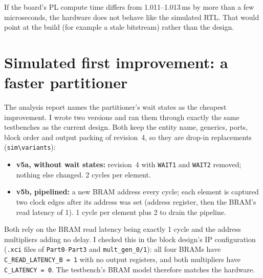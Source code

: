 \documentclass[11pt,a4paper]{article}
\newcommand{\code}[1]{\texttt{#1}}
\begin{document}
If the board's PL compute time differs from 1.011--1.013\,ms by more than a few microseconds, the hardware does not behave like the simulated RTL. That would point at the build (for example a stale bitstream) rather than the design.

\section{Simulated first improvement: a faster partitioner}\label{sec:variants}
The analysis report names the partitioner's wait states as the cheapest improvement. I wrote two versions and ran them through exactly the same testbenches as the current design. Both keep the entity name, generics, ports, block order and output packing of revision~4, so they are drop-in replacements (\code{sim\textbackslash variants}):
\begin{itemize}[noitemsep]
  \item \textbf{v5a, without wait states:} revision~4 with \code{WAIT1} and \code{WAIT2} removed; nothing else changed. 2 cycles per element.
  \item \textbf{v5b, pipelined:} a new BRAM address every cycle; each element is captured two clock edges after its address was set (address register, then the BRAM's read latency of 1). 1 cycle per element plus 2 to drain the pipeline.
\end{itemize}

Both rely on the BRAM read latency being exactly 1 cycle and the address multipliers adding no delay. I checked this in the block design's IP configuration (\code{.xci} files of \code{Part0}--\code{Part3} and \code{mult\_gen\_0/1}): all four BRAMs have \code{C\_READ\_LATENCY\_B = 1} with no output registers, and both multipliers have \code{C\_LATENCY = 0}. The testbench's BRAM model therefore matches the hardware.
\end{document}
